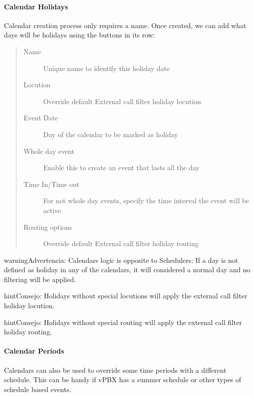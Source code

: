 \documentclass[letterpaper,10pt,spanish]{sphinxmanual}
\begin{document}
\paragraph{Calendar Holidays}
\label{administration_portal/client/vpbx/routing_tools/calendars:calendar-holidays}
Calendar creation process only requires a name. Once created, we can add what
days will be holidays using the buttons in its row:
\begin{quote}
\begin{description}
\item[{Name}] \leavevmode
Unique name to identify this holiday date

\item[{Locution}] \leavevmode
Override default External call filter holiday locution

\item[{Event Date}] \leavevmode
Day of the calendar to be marked as holiday

\item[{Whole day event}] \leavevmode
Enable this to create an event that lasts all the day

\item[{Time In/Time out}] \leavevmode
For not whole day events, specify the time interval the event will be active

\item[{Routing options}] \leavevmode
Override default External call filter holiday routing

\end{description}
\end{quote}

\begin{notice}{warning}{Advertencia:}
Calendars logic is opposite to Schedulers: If a day is not defined
as holiday in any of the calendars, it will considered a normal day and no
filtering will be applied.
\end{notice}

\begin{notice}{hint}{Consejo:}
Holidays without special locutions will apply the external call filter
holiday locution.
\end{notice}

\begin{notice}{hint}{Consejo:}
Holidays without special routing will apply the external call filter
holiday routing.
\end{notice}


\paragraph{Calendar Periods}
\label{administration_portal/client/vpbx/routing_tools/calendars:calendar-periods}\label{administration_portal/client/vpbx/routing_tools/calendars:id2}
Calendars can also be used to override some time periods with a different schedule.
This can be handy if vPBX has a summer schedule or other types of schedule based events.
\end{document}
